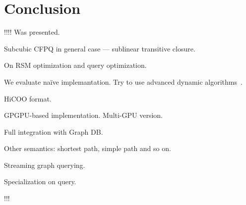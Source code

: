 \section{Conclusion}

!!!! Was presented.

Subcubic CFPQ in general case --- sublinear transitive closure.

On RSM optimization and query optimization.

We evaluate na{\"i}ve implemantation. Try to use advanced dynamic algorithms~\cite{cs6345}.

HiCOO format.

GPGPU-based implementation. Multi-GPU version. 

Full integration with Graph DB.

Other semantics: shortest path, simple path and so on.

Streaming graph querying.

Specialization on query.

!!!